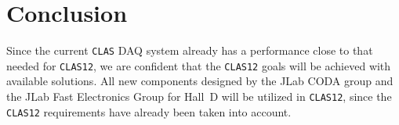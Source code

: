 \section{Conclusion}

Since the current {\tt CLAS} DAQ system already has a performance close 
to that needed for {\tt CLAS12}, we are confident that the {\tt CLAS12} 
goals will be achieved with available solutions.  All new components
designed by the JLab CODA group and the JLab Fast Electronics Group for Hall~D
will be utilized in {\tt CLAS12}, since the {\tt CLAS12} requirements have
already been taken into account.






